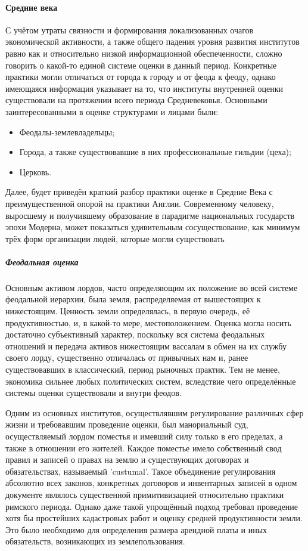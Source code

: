 \documentclass[12pt]{scrartcl}
\begin{document}
\paragraph{Средние века}
С учётом утраты связности и формирования локализованных очагов экономической активности, а также общего падения уровня развития институтов равно как и относительно низкой информационной обеспеченности, сложно говорить о какой-то единой системе оценки в данный период. Конкретные практики могли отличаться от города к городу и от феода к феоду, однако имеющаяся информация указывает на то, что институты внутренней оценки существовали на протяжении всего периода Средневековья. Основными заинтересованными в оценке структурами и лицами были:
\begin{itemize}
	\item Феодалы-землевладельцы;
	\item Города, а также существовавшие в них профессиональные гильдии (цеха);
	\item Церковь.
\end{itemize}
Далее, будет приведён краткий разбор практики оценке в Средние Века с преимущественной опорой на практики Англии. Современному человеку, выросшему и получившему образование в парадигме национальных государств эпохи Модерна, может показаться удивительным сосуществование, как минимум трёх форм организации людей, которые могли существовать
\subparagraph{Феодальная оценка}
Основным активом лордов, часто определяющим их положение во всей системе феодальной иерархии, была земля, распределяемая от вышестоящих к нижестоящим. Ценность земли определялась, в первую очередь, её продуктивностью, и, в какой-то мере, местоположением. Оценка могла носить достаточно субъективный характер, поскольку вся система феодальных отношений и передача активов нижестоящим вассалам в обмен на их службу своего лорду, существенно отличалась от привычных нам и, ранее существовавших в классический, период рыночных практик. Тем не менее, экономика сильнее любых политических систем, вследствие чего определённые системы оценки существовали и внутри феодов.

Одним из основных институтов, осуществлявшим регулирование различных сфер жизни и требовавшим проведение оценки, был манориальный суд, осуществляемый лордом поместья и имевший силу только в его пределах, а также в отношении его жителей. Каждое поместье имело собственный свод правил и записей о правах на землю и существующих договорах и обязательствах, называемый 'custumal'. Такое объединение регулирования абсолютно всех законов, конкретных договоров и инвентарных записей в одном документе являлось существенной примитивизацией относительно практики римского периода. Однако даже такой упрощённый подход требовал проведение хотя бы простейших кадастровых работ и оценку средней продуктивности земли. Это было необходимо для определения размера арендной платы и иных обязательств, возникающих из землепользования.
\end{document}
